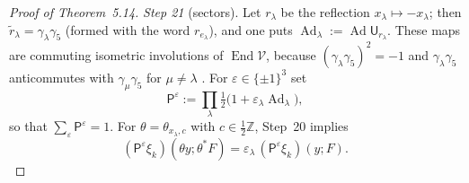\documentclass[11pt]{amsart}
\theoremstyle{definition}
\begin{document}
\begin{proof}[Proof of Theorem~5.14]
\emph{Step 21} (sectors).
Let $r_\lambda$ be the reflection $x_\lambda\mapsto-x_\lambda$; then $\tilde r_\lambda=\gamma_\lambda\gamma_5$ (formed with the word $r_{e_\lambda}$), and one puts $\operatorname{Ad}_\lambda:=\allowbreak \operatorname{Ad}\mathsf U_{r_\lambda}$.
These maps are commuting isometric involutions of $\operatorname{End}\mathcal V$, because $(\gamma_\lambda\gamma_5)^2=-1$ and $\gamma_\lambda\gamma_5$ anticommutes with $\gamma_\mu\gamma_5$ for $\mu\ne\lambda$ \cite[Definition~2.7]{QEDII}.
For $\varepsilon\in\{\pm1\}^3$ set
\begin{equation*}
\mathsf P^\varepsilon:=\prod_\lambda\tfrac12\bigl(1+\varepsilon_\lambda\operatorname{Ad}_\lambda\bigr),
\end{equation*}
so that $\sum_\varepsilon\mathsf P^\varepsilon=1$.
For $\theta=\theta_{x_\lambda,c}$ with $c\in\frac12\mathbb Z$, Step~20 implies
\begin{equation*}
(\mathsf P^\varepsilon\xi_k)(\theta y;\theta^*F)=\varepsilon_\lambda\,(\mathsf P^\varepsilon\xi_k)(y;F).
\end{equation*}


\end{proof}
\end{document}
